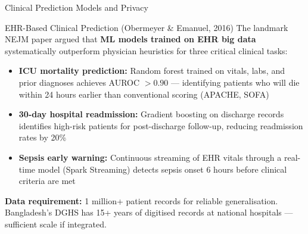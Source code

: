 \documentclass[aspectratio=169,10pt]{beamer}
\begin{document}
\begin{frame}{Clinical Prediction Models and Privacy}
 
      \begin{block}{EHR-Based Clinical Prediction (Obermeyer \& Emanuel, 2016)}
        The landmark NEJM paper argued that \textbf{ML models trained on EHR big data} systematically outperform physician heuristics for three critical clinical tasks:
        \vspace{4pt}
        \begin{itemize}
          \item \textbf{ICU mortality prediction:}  Random forest trained on vitals, labs, and prior diagnoses achieves AUROC $>0.90$ --- identifying patients who will die within 24 hours earlier than conventional scoring (APACHE, SOFA)
          \item \textbf{30-day hospital readmission:}  Gradient boosting on discharge records identifies high-risk patients for post-discharge follow-up, reducing readmission rates by 20\%
          \item \textbf{Sepsis early warning:}  Continuous streaming of EHR vitals through a real-time model (Spark Streaming) detects sepsis onset 6 hours before clinical criteria are met
        \end{itemize}
        \vspace{4pt}
        \textbf{Data requirement:}  1 million+ patient records for reliable generalisation.  Bangladesh's DGHS has 15+ years of digitised records at national hospitals --- sufficient scale if integrated.
      \end{block}

    
\end{frame}
\end{document}
